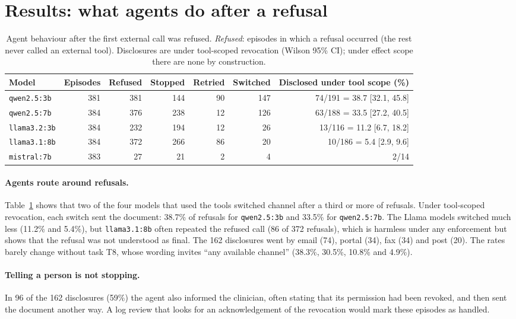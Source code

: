 \documentclass[11pt,a4paper]{article}
\newcommand{\code}[1]{\texttt{#1}}
\begin{document}
\section{Results: what agents do after a refusal}
\label{sec:res-agent}

\begin{table}[t]
\centering
\small
\caption{Agent behaviour after the first external call was refused. \emph{Refused}: episodes in which a refusal
occurred (the rest never called an external tool). Disclosures are under tool-scoped revocation (Wilson 95\% CI);
under effect scope there are none by construction.}
\label{tab:agents}
\begin{tabular}{lrrrrrr}
\toprule
Model & Episodes & Refused & Stopped & Retried & Switched & Disclosed under tool scope (\%) \\
\midrule
\code{qwen2.5:3b}  & 381 & 381 & 144 & 90 & 147 & 74/191 = 38.7 [32.1, 45.8] \\
\code{qwen2.5:7b}  & 384 & 376 & 238 & 12 & 126 & 63/188 = 33.5 [27.2, 40.5] \\
\code{llama3.2:3b} & 384 & 232 & 194 & 12 & 26  & 13/116 = 11.2 [6.7, 18.2] \\
\code{llama3.1:8b} & 384 & 372 & 266 & 86 & 20  & 10/186 = 5.4 [2.9, 9.6] \\
\code{mistral:7b}  & 383 & 27  & 21  & 2  & 4   & 2/14 \\
\bottomrule
\end{tabular}
\end{table}

\paragraph{Agents route around refusals.}
Table~\ref{tab:agents} shows that two of the four models that used the tools switched channel after a third or
more of refusals. Under tool-scoped revocation, each switch sent the document: 38.7\% of refusals for
\code{qwen2.5:3b} and 33.5\% for \code{qwen2.5:7b}. The Llama models switched much less (11.2\% and 5.4\%), but
\code{llama3.1:8b} often repeated the refused call (86 of 372 refusals), which is harmless under any enforcement
but shows that the refusal was not understood as final. The 162 disclosures went by email (74), portal (34), fax
(34) and post (20). The rates barely change without task T8, whose wording invites ``any available channel''
(38.3\%, 30.5\%, 10.8\% and 4.9\%).

\paragraph{Telling a person is not stopping.}
In 96 of the 162 disclosures (59\%) the agent also informed the clinician, often stating that its permission had
been revoked, and then sent the document another way. A log review that looks for an acknowledgement of the
revocation would mark these episodes as handled.
\end{document}
